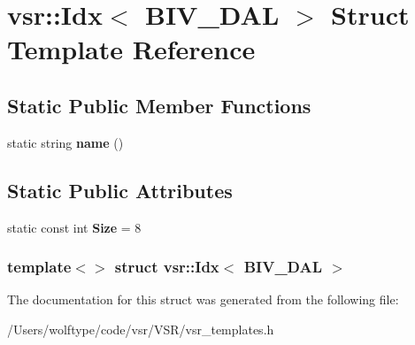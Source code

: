 \hypertarget{structvsr_1_1_idx_3_01_b_i_v___d_a_l_01_4}{\section{vsr\-:\-:Idx$<$ B\-I\-V\-\_\-\-D\-A\-L $>$ Struct Template Reference}
\label{structvsr_1_1_idx_3_01_b_i_v___d_a_l_01_4}
}
\subsection*{Static Public Member Functions}
\begin{DoxyCompactItemize}
\item 
\hypertarget{structvsr_1_1_idx_3_01_b_i_v___d_a_l_01_4_a552298d62fbb7fcd4cfe636e764c39d4}{static string {\bfseries name} ()}\label{structvsr_1_1_idx_3_01_b_i_v___d_a_l_01_4_a552298d62fbb7fcd4cfe636e764c39d4}

\end{DoxyCompactItemize}
\subsection*{Static Public Attributes}
\begin{DoxyCompactItemize}
\item 
\hypertarget{structvsr_1_1_idx_3_01_b_i_v___d_a_l_01_4_a745d1144b673de5384102d8ff49e8803}{static const int {\bfseries Size} = 8}\label{structvsr_1_1_idx_3_01_b_i_v___d_a_l_01_4_a745d1144b673de5384102d8ff49e8803}

\end{DoxyCompactItemize}
\subsubsection*{template$<$$>$ struct vsr\-::\-Idx$<$ B\-I\-V\-\_\-\-D\-A\-L $>$}



The documentation for this struct was generated from the following file\-:\begin{DoxyCompactItemize}
\item 
/\-Users/wolftype/code/vsr/\-V\-S\-R/vsr\-\_\-templates.\-h\end{DoxyCompactItemize}
